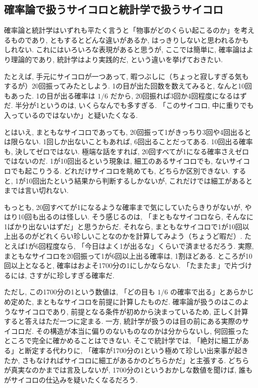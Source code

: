   \subsection{確率論で扱うサイコロと統計学で扱うサイコロ}

    確率論と統計学はいずれも平たく言うと「物事がどのくらい起こるのか」を考えるものであり, ともするとどんな違いがあるか, 
    はっきりしないと思われるかもしれない.
    これにはいろいろな表現があると思うが, ここでは簡単に, 確率論はより理論的であり, 統計学はより実践的だ, という違いを挙げておきたい.

    たとえば, 手元にサイコロが一つあって, 暇つぶしに（ちょっと寂しすぎる気もするが）20回振ってみたとしよう.
    1の目が出た回数を数えてみると, なんと10回もあった.
    1の目が出る確率は $1/6$ だから, 20回振れば3回か4回程度になるはずだ.
    半分が1というのは, いくらなんでも多すぎる.
    「このサイコロ, 中に重りでも入っているのではないか」と疑いたくなる.

    とはいえ, まともなサイコロであっても, 20回振って1がきっちり3回や4回出るとは限らない.
    1回しか出ないこともあれば, 6回出ることだってある.
    10回出る確率も, 決してゼロではない.
    極端な話をすれば, 20回すべてが1になる確率さえゼロではないのだ.
    1が10回出るという現象は, 細工のあるサイコロでも, ないサイコロでも起こりうる.
    どれだけサイコロを眺めても, どちらか区別できない.
    すると, 1が10回出たという結果から判断するしかないが, これだけでは細工があるとまでは言い切れない.

    もっとも, 20回すべてが1になるような確率まで気にしていたらきりがないが, やはり10回も出るのは怪しい.
    そう感じるのは, 「まともなサイコロなら, そんなに1ばかり出ないはずだ」と思うからだ.
    それなら, まともなサイコロで1が10回以上出るのがどれくらい珍しいことなのかを計算してみよう（ちょうど暇だ）.
    たとえば1が6回程度なら, 「今日はよく1が出るな」くらいで済ませるだろう.
    実際, まともなサイコロを20回振って1が6回以上出る確率は, 1割ほどある.
    ところが10回以上となると, 確率はおよそ1700分の1にしかならない.
    「たまたま」で片づけるには, さすがに珍しすぎる確率だ.

    ただし, この1700分の1という数値は, 「どの目も $1/6$ の確率で出る」とあらかじめ定めた, まともなサイコロを前提に計算したものだ.
    確率論が扱うのはこのようなサイコロであり, 前提となる条件が初めから決まっているため, 正しく計算すると答えはただ一つに定まる.
    一方, 統計学が扱うのは目の前にある実際のサイコロだ.
    その構造が本当に偏りのないものなのかは分からないし, 何回振ったところで完全に確かめることはできない.
    そこで統計学では, 「絶対に細工がある」と断定する代わりに, 「確率が1700分の1という極めて珍しい出来事が起きたか, さもなければサイコロに細工があるかのどちらかだ」と主張する.
    どちらが真実なのかまでは言及しないが, 1700分の1というおかしな数値を聞けば, 誰もがサイコロの仕込みを疑いたくなるだろう.

